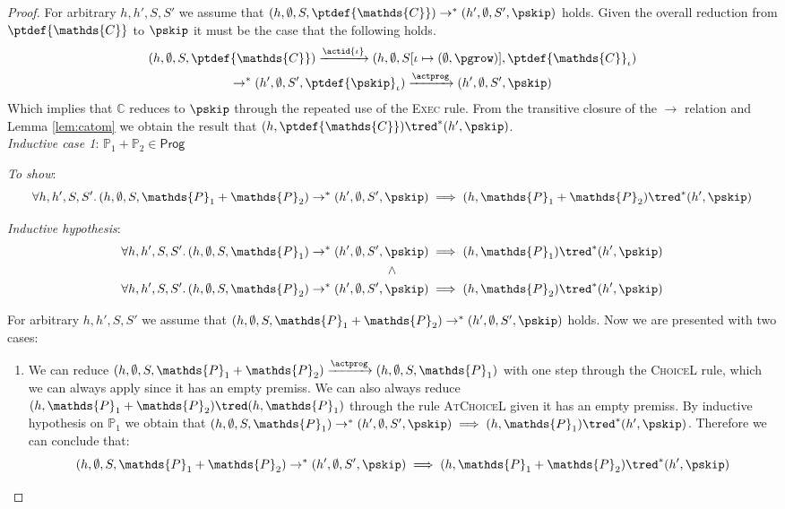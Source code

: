 \begin{thm}
{\begin{proof}
For arbitrary $h, h', S, S'$ we assume that $(h, \emptyset, S, \ptdef{\mathds{C}}) \rightarrow^* (h', \emptyset, S', \pskip)$ holds. Given the overall reduction from $\ptdef{\mathds{C}}$ to $\pskip$ it must be the case that the following holds.
\begin{gather*}
	(h, \emptyset, S, \ptdef{\mathds{C}})
	\xrightarrow{\actid{\iota}} (h, \emptyset, S[\iota \mapsto (\emptyset, \pgrow)], \ptdef{\mathds{C}}_\iota) \\
	\rightarrow^* (h', \emptyset, S', \ptdef{\pskip}_\iota)
	\xrightarrow{\actprog} (h', \emptyset, S', \pskip)
\end{gather*}
Which implies that $\mathds{C}$ reduces to $\pskip$ through the repeated use of the \textsc{Exec} rule. From the transitive closure of the $\rightarrow$ relation and Lemma \ref{lem:catom} we obtain the result that $(h, \ptdef{\mathds{C}}) \tred^* (h', \pskip)$. \\
\indline
\textit{Inductive case 1}: $\mathds{P}_1 + \mathds{P}_2 \in \mathsf{Prog}$

\textit{To show}:
\[
	\forall h, h', S, S' \ldotp
	(h, \emptyset, S, \mathds{P}_1 + \mathds{P}_2) \rightarrow^* (h', \emptyset, S', \pskip) \implies 
	(h, \mathds{P}_1 + \mathds{P}_2 ) \tred^* (h', \pskip)
\]

\textit{Inductive hypothesis}:
\begin{gather*}
	\forall h, h', S, S' \ldotp
	(h, \emptyset, S, \mathds{P}_1) \rightarrow^* (h', \emptyset, S', \pskip) \implies 
	(h, \mathds{P}_1) \tred^* (h', \pskip)
	\\ \land \\
	\forall h, h', S, S' \ldotp
	(h, \emptyset, S, \mathds{P}_2) \rightarrow^* (h', \emptyset, S', \pskip) \implies 
	(h, \mathds{P}_2) \tred^* (h', \pskip)
\end{gather*}

For arbitrary $h, h', S, S'$ we assume that $(h, \emptyset, S, \mathds{P}_1 + \mathds{P}_2) \rightarrow^* (h', \emptyset, S', \pskip)$ holds. Now we are presented with two cases:
\begin{enumerate}
	\item We can reduce $(h, \emptyset, S, \mathds{P}_1 + \mathds{P}_2) \xrightarrow{\actprog} (h, \emptyset, S, \mathds{P}_1)$ with one step through the \textsc{ChoiceL} rule, which we can always apply since it has an empty premiss. We can also always reduce $(h, \mathds{P}_1 + \mathds{P}_2) \tred (h, \mathds{P}_1)$ through the rule \textsc{AtChoiceL} given it has an empty premiss. By inductive hypothesis on $\mathds{P}_1$ we obtain that $(h, \emptyset, S, \mathds{P}_1) \rightarrow^* (h', \emptyset, S', \pskip) \implies (h, \mathds{P}_1) \tred^* (h', \pskip)$. Therefore we can conclude that:
	\[
		(h, \emptyset, S, \mathds{P}_1 + \mathds{P}_2) \rightarrow^* (h', \emptyset, S', \pskip) \implies  (h, \mathds{P}_1 + \mathds{P}_2) \tred^* (h', \pskip)
	\]
	

\end{enumerate}
\end{proof}}
\end{thm}
